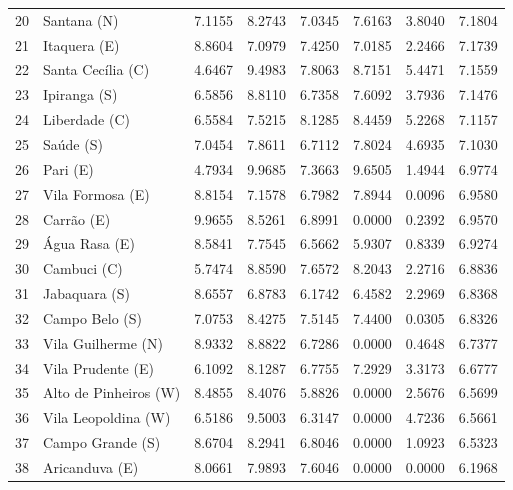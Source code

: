 \documentclass[12pt]{article}
\begin{document}
\begin{longtable}[c]{c|lccccc|c}
20  & Santana            (N) & 7.1155   & 8.2743   & 7.0345   & 7.6163   & 3.8040   & 7.1804  \\
21  & Itaquera           (E) & 8.8604   & 7.0979   & 7.4250   & 7.0185   & 2.2466   & 7.1739  \\
22  & Santa Cecília      (C) & 4.6467   & 9.4983   & 7.8063   & 8.7151   & 5.4471   & 7.1559  \\
23  & Ipiranga           (S) & 6.5856   & 8.8110   & 6.7358   & 7.6092   & 3.7936   & 7.1476  \\
24  & Liberdade          (C) & 6.5584   & 7.5215   & 8.1285   & 8.4459   & 5.2268   & 7.1157  \\
25  & Saúde              (S) & 7.0454   & 7.8611   & 6.7112   & 7.8024   & 4.6935   & 7.1030  \\
26  & Pari               (E) & 4.7934   & 9.9685   & 7.3663   & 9.6505   & 1.4944   & 6.9774  \\
27  & Vila Formosa       (E) & 8.8154   & 7.1578   & 6.7982   & 7.8944   & 0.0096   & 6.9580  \\
28  & Carrão             (E) & 9.9655   & 8.5261   & 6.8991   & 0.0000   & 0.2392   & 6.9570  \\
29  & Água Rasa          (E) & 8.5841   & 7.7545   & 6.5662   & 5.9307   & 0.8339   & 6.9274  \\
30  & Cambuci            (C) & 5.7474   & 8.8590   & 7.6572   & 8.2043   & 2.2716   & 6.8836  \\
31  & Jabaquara          (S) & 8.6557   & 6.8783   & 6.1742   & 6.4582   & 2.2969   & 6.8368  \\
32  & Campo Belo         (S) & 7.0753   & 8.4275   & 7.5145   & 7.4400   & 0.0305   & 6.8326  \\
33  & Vila Guilherme     (N) & 8.9332   & 8.8822   & 6.7286   & 0.0000   & 0.4648   & 6.7377  \\
34  & Vila Prudente      (E) & 6.1092   & 8.1287   & 6.7755   & 7.2929   & 3.3173   & 6.6777  \\
35  & Alto de Pinheiros  (W) & 8.4855   & 8.4076   & 5.8826   & 0.0000   & 2.5676   & 6.5699  \\
36  & Vila Leopoldina    (W) & 6.5186   & 9.5003   & 6.3147   & 0.0000   & 4.7236   & 6.5661  \\
37  & Campo Grande       (S) & 8.6704   & 8.2941   & 6.8046   & 0.0000   & 1.0923   & 6.5323  \\
38  & Aricanduva         (E) & 8.0661   & 7.9893   & 7.6046   & 0.0000   & 0.0000   & 6.1968  \\

\end{longtable}
\end{document}
